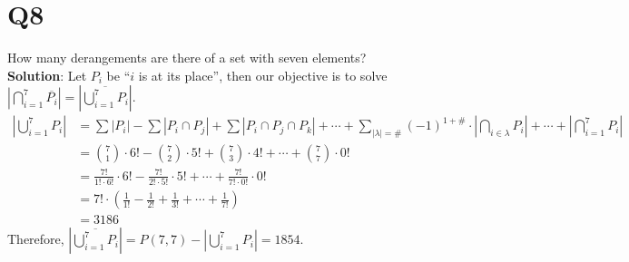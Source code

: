 \documentclass[11pt]{article}
\newenvironment{solution}{{\\\bf Solution}:}{\smallskip}
\begin{document}
\section*{Q8}
How many derangements are there of a set with seven elements?
\begin{solution}
    Let $P_{i }$ be ``$i$ is at its place'', then our objective is to solve $\left\vert \bigcap_{i=1}^{7}\overline{P_{i}} \right\vert 
    =\left\vert \overline{\bigcup_{i=1}^{7}P_{i} } \right\vert $.
    \begin{align*}
        \left\vert \bigcup_{i=1}^{7}P_{i} \right\vert
        &=\sum\left\vert P_{i } \right\vert -\sum\left\vert P_{i}\cap P_{j} \right\vert +\sum \left\vert P_{i }\cap P_{j } \cap P_{k } \right\vert
        + \cdots +\sum_{\left\vert \lambda  \right\vert=\# }(-1)^{1+\#} \cdot \left\vert \bigcap_{i \in \lambda}P_{i } \right\vert + \cdots +
        \left\vert \bigcap_{i=1 }^{7}P_{i} \right\vert \\
        &=\binom{7}{1}\cdot 6!-\binom{7}{2}\cdot 5!+\binom{7}{3}\cdot 4!
            + \cdots +\binom{7}{7}\cdot 0!\\
        &=\frac{7!}{1!\cdot 6!}\cdot 6!-\frac{7!}{2!\cdot 5!}\cdot 5!
            + \cdots +\frac{7!}{7!\cdot 0!}\cdot 0!\\
        &=7!\cdot (\frac{1}{1!}-\frac{1}{2!}+\frac{1}{3!}+ \cdots +\frac{1}{7!})\\
        &=3186
    \end{align*}
    Therefore, $\left\vert \overline{\bigcup_{i=1}^{7}P_{i}} \right\vert 
    =P(7,7)-\left\vert \bigcup_{i=1}^{7}P_{i} \right\vert=1854$.
\end{solution}
\end{document}
